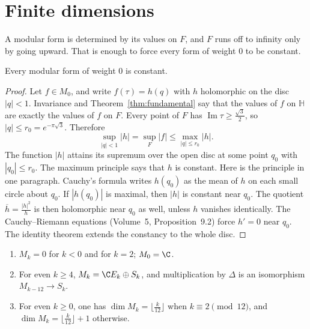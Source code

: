 \section{Finite dimensions}

A modular form is determined by its values on $F$, and $F$ runs off to infinity only by going upward. That is enough to force every form of weight $0$ to be constant.

\begin{lemma}\label{lem:weight0}
Every modular form of weight $0$ is constant.
\end{lemma}

\begin{proof}
Let $f\in M_0$, and write $f(\tau)=h(q)$ with $h$ holomorphic on the disc $|q|<1$. Invariance and Theorem~\ref{thm:fundamental} say that the values of $f$ on $\mathbb H$ are exactly the values of $f$ on $F$. Every point of $F$ has $\operatorname{Im}\tau\ge\frac{\sqrt3}2$, so $|q|\le r_0=e^{-\pi\sqrt3}$. Therefore
\[
\sup_{|q|<1}|h|=\sup_F|f|\le\max_{|q|\le r_0}|h|.
\]
The function $|h|$ attains its supremum over the open disc at some point $q_0$ with $|q_0|\le r_0$. The maximum principle says that $h$ is constant. Here is the principle in one paragraph. Cauchy's formula writes $h(q_0)$ as the mean of $h$ on each small circle about $q_0$. If $|h(q_0)|$ is maximal, then $|h|$ is constant near $q_0$. The quotient $\overline h=\frac{|h|^2}h$ is then holomorphic near $q_0$ as well, unless $h$ vanishes identically. The Cauchy--Riemann equations (Volume~5, Proposition~9.2) force $h'=0$ near $q_0$. The identity theorem extends the constancy to the whole disc.
\end{proof}

\begin{theorem}\label{thm:dimension}
\begin{enumerate}[label=(\alph*)]
\item $M_k=0$ for $k<0$ and for $k=2$; $M_0=\C$.
\item For even $k\ge4$, $M_k=\C E_k\oplus S_k$, and multiplication by $\Delta$ is an isomorphism $M_{k-12}\to S_k$.
\item For even $k\ge0$, one has $\dim M_k=\lfloor\frac k{12}\rfloor$ when $k\equiv2\pmod{12}$, and $\dim M_k=\lfloor\frac k{12}\rfloor+1$ otherwise.
\end{enumerate}
\end{theorem}


